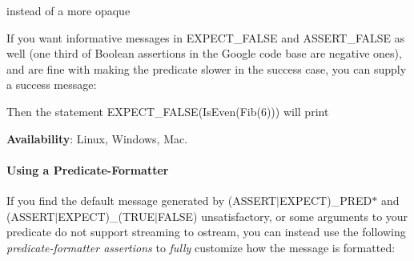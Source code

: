 instead of a more opaque


\begin{DoxyCode}{0}
\end{DoxyCode}


If you want informative messages in {\ttfamily E\+X\+P\+E\+C\+T\+\_\+\+F\+A\+L\+SE} and {\ttfamily A\+S\+S\+E\+R\+T\+\_\+\+F\+A\+L\+SE} as well (one third of Boolean assertions in the Google code base are negative ones), and are fine with making the predicate slower in the success case, you can supply a success message\+:


\begin{DoxyCode}{0}
\DoxyCodeLine{\}}
\end{DoxyCode}


Then the statement {\ttfamily E\+X\+P\+E\+C\+T\+\_\+\+F\+A\+L\+SE(Is\+Even(\+Fib(6)))} will print


\begin{DoxyCode}{0}
\end{DoxyCode}


{\bfseries{Availability}}\+: Linux, Windows, Mac.

\paragraph*{Using a Predicate-\/\+Formatter}

If you find the default message generated by {\ttfamily (A\+S\+S\+E\+R\+T$\vert$\+E\+X\+P\+E\+CT)\+\_\+\+P\+R\+E\+D$\ast$} and {\ttfamily (A\+S\+S\+E\+R\+T$\vert$\+E\+X\+P\+E\+CT)\+\_\+(T\+R\+U\+E$\vert$\+F\+A\+L\+SE)} unsatisfactory, or some arguments to your predicate do not support streaming to {\ttfamily ostream}, you can instead use the following {\itshape predicate-\/formatter assertions} to {\itshape fully} customize how the message is formatted\+:

